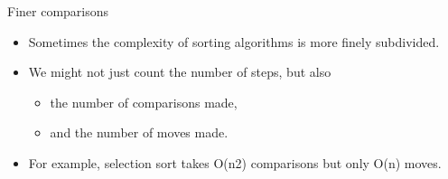 \documentclass{beamer}
\begin{document}
\begin{frame}
\end{frame} \begin{frame}

Finer comparisons

\begin{itemize}
\item Sometimes the complexity of sorting algorithms is more finely subdivided.
\item We might not just count the number of steps, but also

\begin{itemize}
\item the number of comparisons made, 
\item and the number of moves made.
\end{itemize}
\item For example, selection sort takes O(n2) comparisons but only O(n) moves.
\end{itemize}

\end{frame} 
\end{document}
